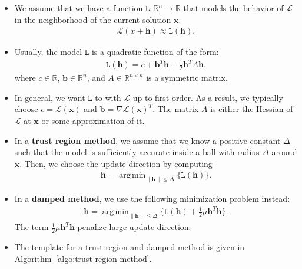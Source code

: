 \documentclass[10pt]{article}
\newcommand{\ve}[1]{\mathbf{#1}}
\newcommand{\ra}{\rightarrow}
\newcommand{\mcal}[1]{\mathcal{#1}}
\newcommand{\Real}{\mathbb{R}}
\DeclareMathOperator*{\argmin}{arg\,min}
\begin{document}
\begin{itemize}    
    \item We assume that we have a function $\mathtt{L}: \Real^n \ra \Real$ that models the behavior of $\mcal{L}$ in the neighborhood of the current solution $\ve{x}$.
    \begin{align*}
        \mcal{L}(x + \ve{h}) \approx \mathtt{L}(\ve{h}).
    \end{align*}
    
    \item Usually, the model $\mathtt{L}$ is a quadratic function of the form:
    \begin{align*}
        \mathtt{L}(\ve{h}) = c + \ve{b}^T \ve{h} + \frac{1}{2} \ve{h}^T A \ve{h}.
    \end{align*}
    where $c \in \Real$, $\ve{b} \in \Real^n$, and $A \in \Real^{n \times n}$ is a symmetric matrix.

    \item In general, we want $\mathtt{L}$ to with $\mcal{L}$ up to first order. As a result, we typically choose $c = \mcal{L}(\ve{x})$ and $\ve{b} = \nabla\mcal{L}(\ve{x})^T$. The matrix $A$ is either the Hessian of $\mcal{L}$ at $\ve{x}$ or some approximation of it.
    
    \item In a {\bf trust region method}, we assume that we know a positive constant $\Delta$ such that the model is sufficiently accurate inside a ball with radius $\Delta$ around $\ve{x}$. Then, we choose the update direction by computing
    \begin{align}
        \ve{h} = \argmin_{\| \ve{h} \| \leq \Delta} \{ \mathtt{L}(\ve{h}) \}. \label{eq:trust-region-method-optimization}
    \end{align}

    \item In a {\bf damped method}, we use the following minimization problem instead:
    \begin{align}
        \ve{h} = \argmin_{\| \ve{h} \| \leq \Delta} \bigg\{ \mathtt{L}(\ve{h}) + \frac{1}{2}\mu \ve{h}^T \ve{h} \bigg\}. \label{eq:damped-method-optimization}
    \end{align}
    The term $\frac{1}{2}\mu\ve{h}^T \ve{h}$ penalize large update direction.

    \item The template for a trust region and damped method is given in Algorithm~\ref{algo:trust-region-method}.    


\end{itemize}
\end{document}
